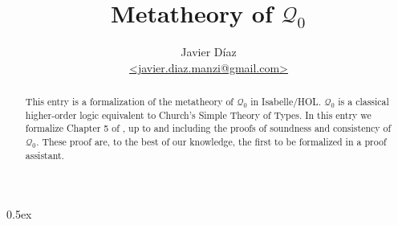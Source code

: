 \documentclass[11pt,a4paper]{article}
\begin{document}
\title{Metatheory of $\mathcal{Q}_0$}
\author{Javier D\'iaz\\\url{<javier.diaz.manzi@gmail.com>}}
\maketitle

\begin{abstract}
This entry is a formalization of the metatheory of $\mathcal{Q}_0$ in Isabelle/HOL. $\mathcal{Q}_0$ \cite{andrews:2002} is a classical higher-order logic equivalent to Church's Simple Theory of Types. In this entry we formalize Chapter 5 of \cite{andrews:2002}, up to and including the proofs of soundness and consistency of $\mathcal{Q}_0$. These proof are, to the best of our knowledge, the first to be formalized in a proof assistant.
\end{abstract}

\newpage
\tableofcontents

\parindent 0pt\parskip 0.5ex

\newpage




\end{document}
